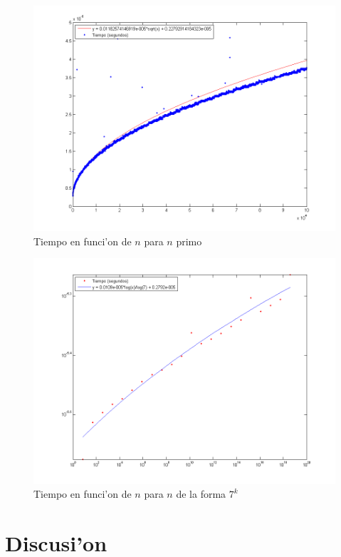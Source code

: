 \begin{figure}[H]
\centering
\includegraphics[scale=0.5]{../../codigo/ejercicio1/benchmark_de_tiempo/graficos/primos/primosTiempo.png}
\caption{Tiempo en funci'on de $n$ para $n$ primo}
\end{figure}

\begin{figure}[H]
\centering
\includegraphics[scale=0.5]{../../codigo/ejercicio1/benchmark_de_tiempo/graficos/potencias_de_7/Potencias_de_7_tiempo.png}
\caption{Tiempo en funci'on de $n$ para $n$ de la forma $7^k$}
\end{figure}

\section{Discusi'on}

